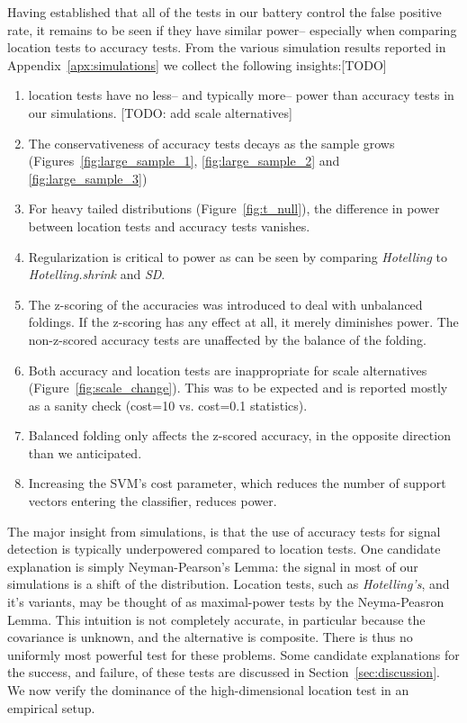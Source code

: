 \documentclass[12pt,a4paper]{article}
\begin{document}
Having established that all of the tests in our battery control the false positive rate, it remains to be seen if they have similar power-- especially when comparing location tests to accuracy tests. 
From the various simulation results reported in Appendix~\ref{apx:simulations} we collect the following insights:[TODO]
\begin{enumerate}
\item location tests have no less-- and typically more-- power than accuracy tests in our simulations. [TODO: add scale alternatives]

\item The conservativeness of accuracy tests decays as the sample grows (Figures~\ref{fig:large_sample_1}, \ref{fig:large_sample_2} and \ref{fig:large_sample_3})

\item For heavy tailed distributions (Figure~\ref{fig:t_null}), the difference in power between location tests and accuracy tests vanishes. 

\item Regularization is critical to power as can be seen by comparing \emph{Hotelling} to \emph{Hotelling.shrink} and \emph{SD}.

\item The z-scoring of the accuracies was introduced to deal with unbalanced foldings. 
If the z-scoring has any effect at all, it merely diminishes power.
The non-z-scored accuracy tests are unaffected by the balance of the folding.

\item Both accuracy and location tests are inappropriate for scale alternatives (Figure~\ref{fig:scale_change}). 
This was to be expected and is reported mostly as a sanity check (cost=10 vs. cost=0.1 statistics).

\item Balanced folding only affects the z-scored accuracy, in the opposite direction than we anticipated. 

\item Increasing the SVM's cost parameter, which reduces the number of support vectors entering the classifier, reduces power. 

\end{enumerate}


The major insight from simulations, is that the use of accuracy tests for signal detection is typically underpowered compared to location tests. 
One candidate explanation is simply Neyman-Pearson's Lemma: the signal in most of our simulations is a shift of the distribution. 
Location tests, such as \emph{Hotelling's}, and it's variants, may be thought of as maximal-power tests by the Neyma-Peasron Lemma. 
This intuition is not completely accurate, in particular because the covariance is unknown, and the alternative is composite. 
There is thus no uniformly most powerful test for these problems. 
Some candidate explanations for the success, and failure, of these tests are discussed in Section~\ref{sec:discussion}. 
We now verify the dominance of the high-dimensional location test in an empirical setup. 
\end{document}
